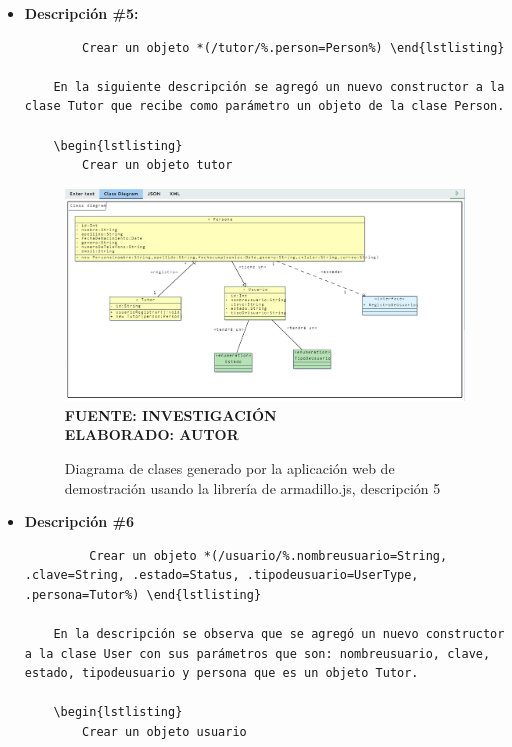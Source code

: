 \begin{itemize}
	\item \textbf{Descripción \#5:}
	\begin{lstlisting}
		Crear un objeto *(/tutor/%.person=Person%) \end{lstlisting}

	En la siguiente descripción se agregó un nuevo constructor a la clase Tutor que recibe como parámetro un objeto de la clase Person. 
	
	\begin{lstlisting}
		Crear un objeto tutor  \end{lstlisting}
	
	\begin{figure}[h!]
		\centering
		\caption{Diagrama de clases generado por la aplicación web de demostración usando la librería de armadillo.js, descripción 5}
		\includegraphics[width=15cm]{img/prueba05.png}
		\label{fig:prueba05}
		\vspace{4mm}
		{\footnotesize \textbf{\\ FUENTE: INVESTIGACIÓN} \textbf{\\ ELABORADO: AUTOR}}
	\end{figure}

	\item \textbf{Descripción \#6}
	\begin{lstlisting}
		 Crear un objeto *(/usuario/%.nombreusuario=String, .clave=String, .estado=Status, .tipodeusuario=UserType, .persona=Tutor%) \end{lstlisting}
	
	En la descripción se observa que se agregó un nuevo constructor a la clase User con sus parámetros que son: nombreusuario, clave, estado, tipodeusuario y persona que es un objeto Tutor. 
	
	\begin{lstlisting}
		Crear un objeto usuario  \end{lstlisting}
	

\end{itemize}
